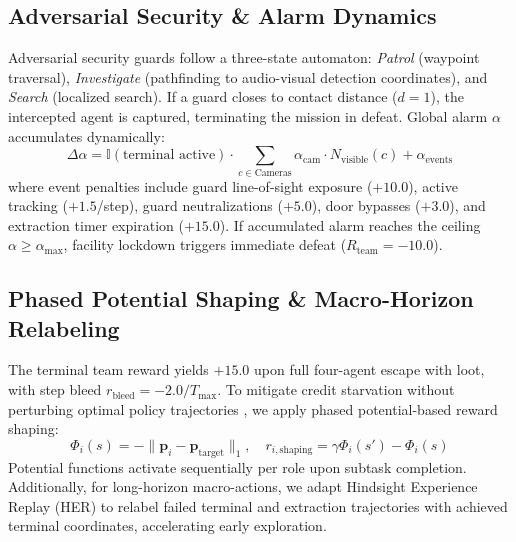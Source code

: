 \subsection{Adversarial Security \& Alarm Dynamics}
Adversarial security guards follow a three-state automaton: \emph{Patrol} (waypoint traversal), \emph{Investigate} (pathfinding to audio-visual detection coordinates), and \emph{Search} (localized search). If a guard closes to contact distance ($d = 1$), the intercepted agent is captured, terminating the mission in defeat. Global alarm $\alpha$ accumulates dynamically:
\begin{equation}
\Delta \alpha = \mathbb{I}(\text{terminal active}) \cdot \sum_{c \in \text{Cameras}} \alpha_{\text{cam}} \cdot N_{\text{visible}}(c) + \alpha_{\text{events}}
\end{equation}
where event penalties include guard line-of-sight exposure ($+10.0$), active tracking ($+1.5$/step), guard neutralizations ($+5.0$), door bypasses ($+3.0$), and extraction timer expiration ($+15.0$). If accumulated alarm reaches the ceiling $\alpha \ge \alpha_{\max}$, facility lockdown triggers immediate defeat ($R_{\text{team}} = -10.0$).

\subsection{Phased Potential Shaping \& Macro-Horizon Relabeling}
The terminal team reward yields $+15.0$ upon full four-agent escape with loot, with step bleed $r_{\text{bleed}} = -2.0 / T_{\max}$. To mitigate credit starvation without perturbing optimal policy trajectories \citep{ng1999policy}, we apply phased potential-based reward shaping:
\begin{equation}
\Phi_i(s) = -\|\mathbf{p}_i - \mathbf{p}_{\text{target}}\|_1, \quad r_{i,\text{shaping}} = \gamma \Phi_i(s') - \Phi_i(s)
\end{equation}
Potential functions activate sequentially per role upon subtask completion. Additionally, for long-horizon macro-actions, we adapt Hindsight Experience Replay (HER) \citep{andrychowicz2017hindsight} to relabel failed terminal and extraction trajectories with achieved terminal coordinates, accelerating early exploration.
